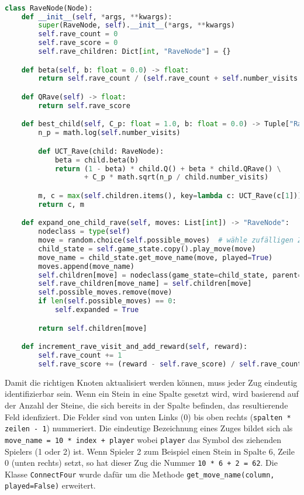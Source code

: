 \begin{lstlisting}[language=Python,label={lst:rave-node}]

class RaveNode(Node):
    def __init__(self, *args, **kwargs):
        super(RaveNode, self).__init__(*args, **kwargs)
        self.rave_count = 0
        self.rave_score = 0
        self.rave_children: Dict[int, "RaveNode"] = {}

    def beta(self, b: float = 0.0) -> float:
        return self.rave_count / (self.rave_count + self.number_visits + self.rave_count * self.number_visits * b * b)

    def QRave(self) -> float:
        return self.rave_score

    def best_child(self, C_p: float = 1.0, b: float = 0.0) -> Tuple["RaveNode", int]:
        n_p = math.log(self.number_visits)

        def UCT_Rave(child: RaveNode):
            beta = child.beta(b)
            return (1 - beta) * child.Q() + beta * child.QRave() \
                   + C_p * math.sqrt(n_p / child.number_visits)

        m, c = max(self.children.items(), key=lambda c: UCT_Rave(c[1]))
        return c, m

    def expand_one_child_rave(self, moves: List[int]) -> "RaveNode":
        nodeclass = type(self)
        move = random.choice(self.possible_moves)  # wähle zufälligen Zug
        child_state = self.game_state.copy().play_move(move)
        move_name = child_state.get_move_name(move, played=True)
        moves.append(move_name)
        self.children[move] = nodeclass(game_state=child_state, parent=self)
        self.rave_children[move_name] = self.children[move]
        self.possible_moves.remove(move)
        if len(self.possible_moves) == 0:
            self.expanded = True

        return self.children[move]

    def increment_rave_visit_and_add_reward(self, reward):
        self.rave_count += 1
        self.rave_score += (reward - self.rave_score) / self.rave_count
\end{lstlisting}

Damit die richtigen Knoten aktualisiert werden können, muss jeder Zug eindeutig identifizierbar sein.
Wenn ein Stein in eine Spalte gesetzt wird, wird basierend auf der Anzahl der Steine, die sich bereits in der Spalte befinden, das resultierende Feld idenfiziert.
Die Felder sind von unten Links (0) bis oben rechts (\verb|spalten * zeilen - 1|) nummeriert.
Die eindeutige Bezeichnung eines Zuges bildet sich als \verb|move_name = 10 * index + player| wobei \verb|player| das Symbol des ziehenden Spielers (1 oder 2) ist.
Wenn Spieler 2 zum Beispiel einen Stein in Spalte 6, Zeile 0 (unten rechts) setzt, so hat dieser Zug die Nummer \verb|10 * 6 + 2 = 62|.
Die Klasse \verb|ConnectFour| wurde dafür um die Methode \verb|get_move_name(column, played=False)| erweitert.

